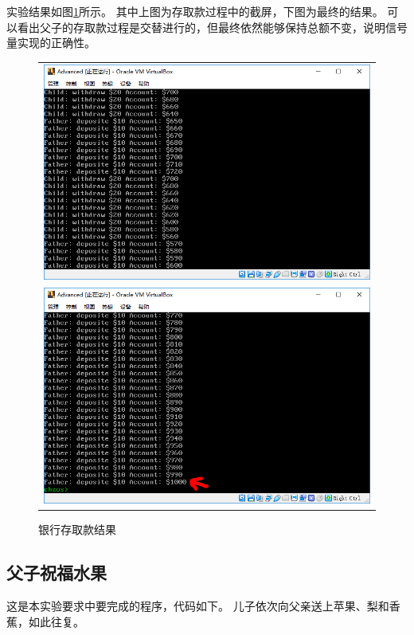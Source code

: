 \documentclass[logo,reportComp]{thesis}
\begin{document}
实验结果如图\ref{fig:bank}所示。
其中上图为存取款过程中的截屏，下图为最终的结果。
可以看出父子的存取款过程是交替进行的，但最终依然能够保持总额不变，说明信号量实现的正确性。
\begin{figure}[H]
\centering
\begin{tabular}{c}
\includegraphics[width=0.8\linewidth]{fig/bank.PNG}\\
\includegraphics[width=0.8\linewidth]{fig/bank-final.PNG}
\end{tabular}
\caption{银行存取款结果}
\label{fig:bank}
\end{figure}

\subsection{父子祝福水果}
这是本实验要求中要完成的程序，代码如下。
儿子依次向父亲送上苹果、梨和香蕉，如此往复。
\end{document}
